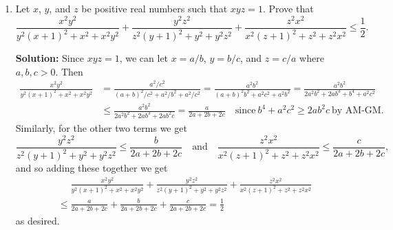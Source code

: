 \documentclass{article}
\begin{document}
\begin{enumerate}[itemsep=24pt]
\item %
Let $x$, $y$, and $z$ be positive real numbers such that $xyz = 1$.
Prove that
\[ \frac{x^2y^2}{y^2(x+1)^2+x^2+x^2y^2} +\frac{y^2z^2}{z^2(y+1)^2+y^2+y^2z^2} +\frac{z^2x^2}{x^2(z+1)^2+z^2+z^2x^2} \leq \frac{1}{2}. \]

\textbf{Solution:}
Since $xyz = 1$, we can let $x = a/b$, $y = b/c$, and $z = c/a$ where $a,b,c > 0$.
Then
\begin{align*}
  \frac{x^2y^2}{y^2(x+1)^2+x^2+x^2y^2} &= \frac{a^2/c^2}{(a+b)^2/c^2+a^2/b^2+a^2/c^2} = \frac{a^2b^2}{(a+b)^2b^2+a^2c^2+a^2b^2} = \frac{a^2b^2}{2a^2b^2+2ab^3+b^4+a^2c^2} \\
  &\leq \frac{a^2b^2}{2a^2b^2+2ab^3+2ab^2c} = \frac{a}{2a+2b+2c} \quad\text{since}\ b^4+a^2c^2 \geq 2ab^2c \ \text{by AM-GM.}
\end{align*}
Similarly, for the other two terms we get
\[ \frac{y^2z^2}{z^2(y+1)^2+y^2+y^2z^2} \leq \frac{b}{2a+2b+2c} \quad\text{and}\quad \frac{z^2x^2}{x^2(z+1)^2+z^2+z^2x^2} \leq \frac{c}{2a+2b+2c}, \]
and so adding these together we get
\begin{align*}
  &\mspace{24mu} \frac{x^2y^2}{y^2(x+1)^2+x^2+x^2y^2} +\frac{y^2z^2}{z^2(y+1)^2+y^2+y^2z^2} +\frac{z^2x^2}{x^2(z+1)^2+z^2+z^2x^2} \\
  &\leq \frac{a}{2a+2b+2c} +\frac{b}{2a+2b+2c} +\frac{c}{2a+2b+2c} = \frac{1}{2}
\end{align*}
as desired.

\end{enumerate}
\end{document}

